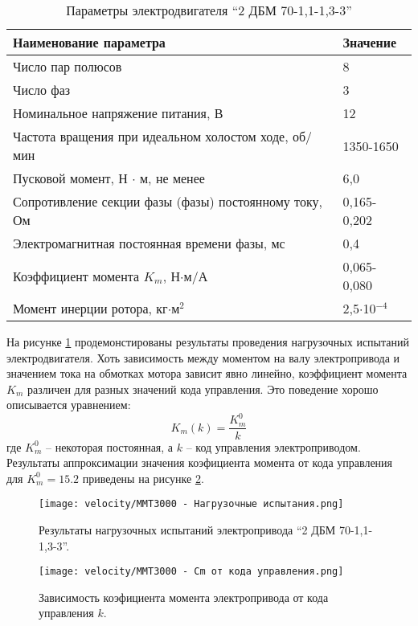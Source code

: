 \begin{table}
    \caption{Параметры электродвигателя ``2 ДБМ 70-1,1-1,3-3'' }\label{tab:mmt300_motor}
    \centering
    \begin{tabular}{ll}
        \toprule
        Наименование параметра  & Значение\\
        \midrule
        Число пар полюсов & 8 \\
        Число фаз & 3 \\
        Номинальное напряжение питания, В   & 12 \\
        Частота вращения при идеальном холостом ходе, об/мин & 1350-1650 \\
        Пусковой момент, Н $\cdot$ м, не менее      & 6,0 \\
        Сопротивление секции фазы (фазы) постоянному току, Ом & 0,165-0,202 \\
        Электромагнитная постоянная времени фазы, мс & 0,4 \\
        Коэффициент момента $K_m$, Н$\cdot$м/А   & 0,065-0,080   \\
        Момент инерции ротора, кг$\cdot$м$^2$   & 2,5$\cdot$10$^{-4}$ \\
        \bottomrule
    \end{tabular}
\end{table}
На рисунке \ref{fig:motor_load_test} продемонстированы результаты проведения нагрузочных испытаний электродвигателя.
Хоть зависимость между моментом на валу электропривода и значением тока на обмотках мотора зависит явно линейно, коэффициент момента $K_m$ различен для разных значений кода управления.
Это поведение хорошо описывается уравнением:
\begin{equation*}
    K_m(k) = \frac{K_m^0}{k}
\end{equation*}
\noindent где $K_m^0$ -- некоторая постоянная, а $k$ -- код управления электроприводом.
Результаты аппроксимации значения коэфициента момента от кода управления для $K_m^0 = 15.2$ приведены на рисунке \ref{fig:function_cm}.

\begin{figure}[ht]
    \centering
    \texttt{[image: velocity/MMT3000 - Нагрузочные испытания.png]}
    \caption{Результаты нагрузочных испытаний электропривода ``2 ДБМ 70-1,1-1,3-3''.}
    \label{fig:motor_load_test}
\end{figure}

\begin{figure}[ht]
    \centering
    \texttt{[image: velocity/MMT3000 - Cm от кода управления.png]}
    \caption{Зависимость коэфициента момента электропривода от кода управления $k$.}
    \label{fig:function_cm}
\end{figure}

